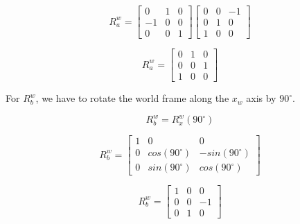 \documentclass[answers]{exam}
\begin{document}
\begin{questions}
\begin{parts}
\begin{solution}
            \begin{equation*}
                R^w_a = \begin{bmatrix}
                    0  & 1 & 0 \\
                    -1 & 0 & 0 \\
                    0  & 0 & 1
                \end{bmatrix}
                \begin{bmatrix}
                    0 & 0 & -1 \\
                    0 & 1 & 0  \\
                    1 & 0 & 0
                \end{bmatrix}
            \end{equation*}

            \begin{equation*}
                R^w_a = \begin{bmatrix}
                    0 & 1 & 0 \\
                    0 & 0 & 1 \\
                    1 & 0 & 0
                \end{bmatrix}
            \end{equation*}

            For $R^w_b$, we have to rotate the world frame along the $x_w$ axis by
            $90^{\circ}$.

            \begin{equation*}
                R^w_b = R^w_x(90^{\circ})
            \end{equation*}

            \begin{equation*}
                R^w_b = \begin{bmatrix}
                    1 & 0               & 0                \\
                    0 & cos(90^{\circ}) & -sin(90^{\circ}) \\
                    0 & sin(90^{\circ}) & cos(90^{\circ})
                \end{bmatrix}
            \end{equation*}

            \begin{equation*}
                R^w_b = \begin{bmatrix}
                    1 & 0 & 0  \\
                    0 & 0 & -1 \\
                    0 & 1 & 0
                \end{bmatrix}
            \end{equation*}
        \end{solution}

\end{parts}
\end{questions}
\end{document}
